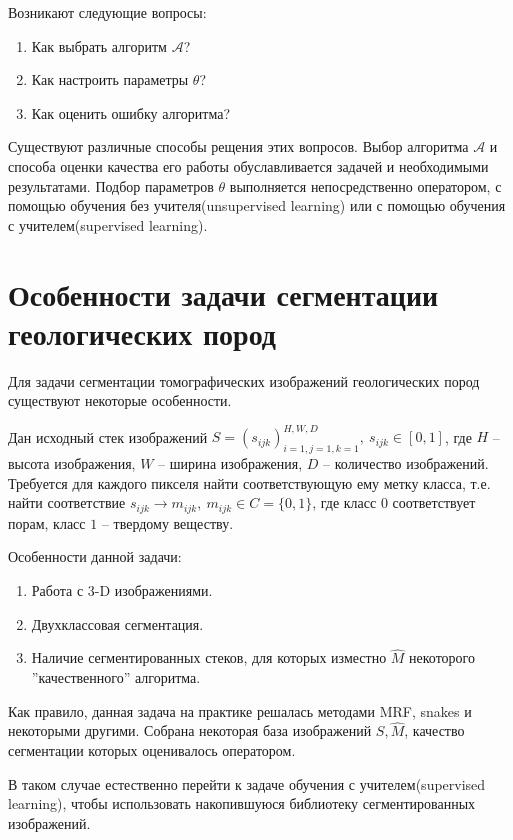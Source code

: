 \documentclass[14pt, a4paper, oneside, bold]{extarticle}
\begin{document}
Возникают следующие вопросы:
\begin{enumerate}
	\item Как выбрать алгоритм $\mathcal{A}$?
	\item Как настроить параметры $\theta$?
	\item Как оценить ошибку алгоритма?
\end{enumerate}
Существуют различные способы рещения этих вопросов.
Выбор алгоритма $\mathcal{A}$ и способа оценки качества его работы обуславливается задачей и необходимыми результатами. 
Подбор параметров $\theta$ выполняется непосредственно 
оператором, с помощью 
обучения без учителя(unsupervised learning) или с помощью обучения с учителем(supervised learning).

\newpage


\section{Особенности задачи сегментации геологических пород} \label{seg_features}

Для задачи сегментации томографических изображений геологических пород существуют некоторые особенности. 
 
Дан исходный стек изображений 
	$S = (s_{ijk})_{i=1, j=1, k=1}^{H, W, D},\ s_{ijk} \in [0, 1]$, где 
$H$ -- высота изображения, $W$ -- ширина изображения, $D$ -- количество изображений. 
Требуется для каждого пикселя найти соответствующую ему метку класса, 
т.е. найти соответствие $s_{ijk} \rightarrow m_{ijk},\ m_{ijk} \in C = \{ 0, 1 \} $, где класс $0$ соответствует порам, класс $1$ -- твердому веществу.

Особенности данной задачи:
\begin{enumerate}
	\item Работа с 3-D изображениями.
	\item Двухклассовая сегментация.
	\item Наличие сегментированных стеков, для которых изместно 
	$\hat{M}$ некоторого ''качественного'' алгоритма.	
\end{enumerate}

Как правило, данная задача на практике решалась методами MRF, snakes и некоторыми другими. Собрана некоторая база изображений 
$S, \hat{M}$, качество сегментации которых оценивалось оператором.

В таком случае естественно перейти к задаче обучения с учителем(supervised learning), чтобы использовать накопившуюся библиотеку сегментированных изображений. 
\end{document}
